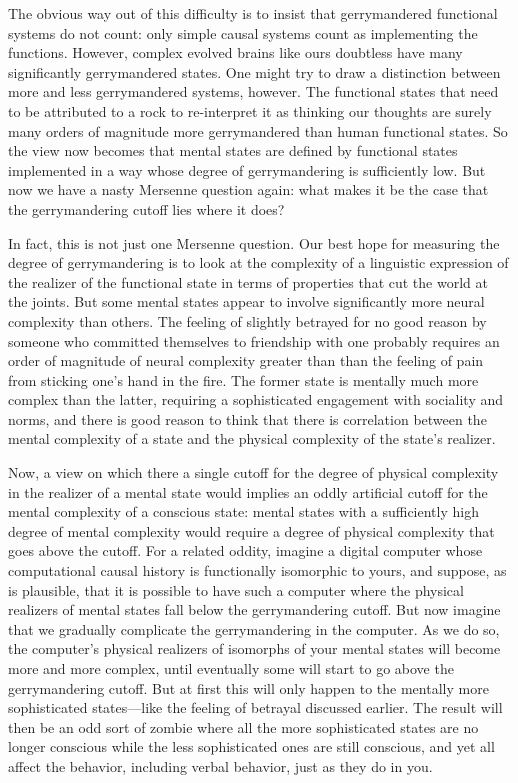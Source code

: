 The obvious way out of this difficulty is to insist that gerrymandered functional systems do not count: only simple causal
systems count as implementing the functions. However, complex evolved brains like ours doubtless have many  significantly
gerrymandered states. One might try to draw a distinction between more and less gerrymandered systems, however. The functional states 
that need to be attributed to a rock to re-interpret it as thinking our thoughts are surely many orders of magnitude more gerrymandered
than human functional states. So the view now becomes that mental states are defined by functional states implemented
in a way whose degree of gerrymandering is sufficiently low.  But now we have a nasty Mersenne question again: 
what makes it be the case that the gerrymandering cutoff lies where it does?

In fact, this is not just one Mersenne question. Our best hope for measuring the degree of gerrymandering is to
look at the complexity of a linguistic expression of the realizer of the functional state in terms of properties that cut
the world at the joints. But some mental states appear to involve significantly more neural complexity than others.
The feeling of slightly betrayed for no good reason by someone who committed themselves to friendship with one 
probably requires an order of magnitude of neural complexity greater than than the feeling of pain from sticking
one's hand in the fire. The former state is mentally much more complex than the latter, requiring a sophisticated
engagement with sociality and norms, and there is good reason to think that there is correlation between the mental
complexity of a state and the physical complexity of the state's realizer. 

Now, a view on which there a single cutoff for the degree of physical complexity in the realizer of a 
mental state would implies an oddly artificial cutoff for the mental complexity of a conscious state: 
mental states with a sufficiently high degree of mental complexity would require a degree of physical 
complexity that goes above the cutoff. For a related oddity, imagine a digital computer whose computational
causal history is functionally isomorphic to yours, and suppose, as is plausible, that it is possible to 
have such a computer where the physical realizers of mental states fall below the gerrymandering cutoff.
But now imagine that we gradually complicate the gerrymandering in the computer.
As we do so, the computer's physical realizers of isomorphs of your mental states will become more and more
complex, until eventually some will start to go above the gerrymandering cutoff. But at first this will only
happen to the mentally more sophisticated states---like the feeling of betrayal discussed earlier. The result will then be an odd sort of zombie where all the more sophisticated states are no longer conscious while the less sophisticated 
ones are still conscious, and yet all affect the behavior, including verbal behavior, just as they do in you.

